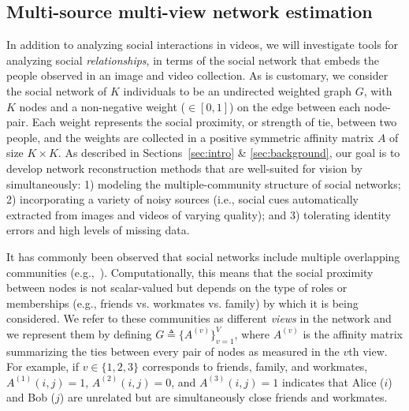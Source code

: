 
\subsection{Multi-source multi-view network estimation}
\label{sec:vis2net}
\vspace{-5pt}
In addition to analyzing social interactions in videos, we will investigate tools for analyzing social \emph{relationships}, in terms of the social network that embeds the people observed in an image and video collection. As is customary, we consider the social network of $K$ individuals to be an undirected weighted graph $G$, with $K$ nodes and a non-negative weight ($\in [0,1]$) on the edge between each node-pair. Each  weight represents the social proximity, or strength of tie, between two people, and the weights are collected in a positive symmetric affinity matrix $A$ of size $K\times K$. As described in Sections~\ref{sec:intro} \& \ref{sec:background}, our goal is to develop network reconstruction methods that are well-suited for vision by simultaneously: 1) modeling the multiple-community structure of social networks; 2) incorporating a variety of noisy sources (i.e., social cues automatically extracted from images and videos of varying quality); and 3) tolerating identity errors and high levels of missing data.

It has commonly been observed that social networks include multiple overlapping communities (e.g.,~\cite{AiroldiBFX08,Kim12}). Computationally, this means that the social proximity between nodes is not scalar-valued but depends on the type of roles or memberships (e.g., friends vs. workmates vs. family) by which it is being considered. We refer to these communities as different \emph{views} in the network and we represent them by defining $G\triangleq\{A^{(v)}\}_{v=1}^{V}$, where $A^{(v)}$ is the affinity matrix summarizing the ties between every pair of nodes as measured in the $v$th view. For example, if $v\in\{1,2,3\}$ corresponds to friends, family, and workmates,  $A^{(1)}(i,j)=1$, $A^{(2)}(i,j)=0$, and $A^{(3)}(i,j)=1$ indicates that Alice ($i$) and Bob ($j$) are unrelated but are simultaneously close friends and workmates. 

